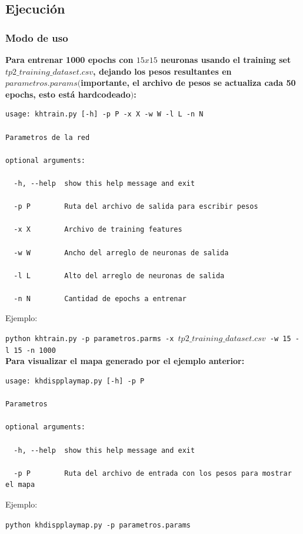 \subsection{Ejecución}

\subsubsection{Modo de uso}

\textbf{Para entrenar 1000 epochs con $15x15$ neuronas usando el training set $tp2\_training\_dataset.csv$, dejando los pesos resultantes en $parametros.params ($importante, el archivo de pesos se actualiza cada 50 epochs, esto está hardcodeado$)$:}

\begin{lstlisting}[style=bash]
usage: khtrain.py [-h] -p P -x X -w W -l L -n N

Parametros de la red

optional arguments:

  -h, --help  show this help message and exit

  -p P        Ruta del archivo de salida para escribir pesos

  -x X        Archivo de training features

  -w W        Ancho del arreglo de neuronas de salida

  -l L        Alto del arreglo de neuronas de salida

  -n N        Cantidad de epochs a entrenar
\end{lstlisting}

Ejemplo:

\noindent\texttt{python khtrain.py -p parametros.parms -x $tp2\_training\_dataset.csv$ -w 15 -l 15 -n 1000} \\

\textbf{Para visualizar el mapa generado por el ejemplo anterior:}

\begin{lstlisting}[style=bash]
usage: khdispplaymap.py [-h] -p P

Parametros

optional arguments:

  -h, --help  show this help message and exit

  -p P        Ruta del archivo de entrada con los pesos para mostrar el mapa

\end{lstlisting}

Ejemplo: 

\noindent\texttt{python khdispplaymap.py -p parametros.params} \\


